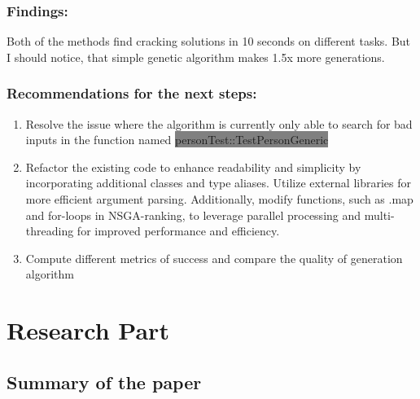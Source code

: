\documentclass[12pt,letterpaper]{article}
\begin{document}
\subsubsection*{Findings:}
Both of the methods find cracking solutions in 10 seconds on different tasks. But I should notice, that simple genetic algorithm makes 1.5x more generations.

\subsubsection*{Recommendations for the next steps:}
\begin{enumerate}
\item Resolve the issue where the algorithm is currently only able to search for bad inputs in the function named \colorbox{gray}{personTest::TestPersonGeneric}
\item Refactor the existing code to enhance readability and simplicity by incorporating additional classes and type aliases. Utilize external libraries for more efficient argument parsing. Additionally, modify functions, such as .map and for-loops in NSGA-ranking, to leverage parallel processing and multi-threading for improved performance and efficiency.
\item Compute different metrics of success and compare the quality of generation algorithm

\end{enumerate}
\newpage
\section*{Research Part}
\subsection*{Summary of the paper}
\end{document}
